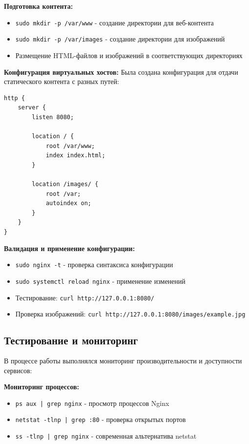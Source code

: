 \textbf{Подготовка контента:}
\begin{itemize}
    \item \texttt{sudo mkdir -p /var/www} - создание директории для веб-контента
    \item \texttt{sudo mkdir -p /var/images} - создание директории для изображений
    \item Размещение HTML-файлов и изображений в соответствующих директориях
\end{itemize}

\textbf{Конфигурация виртуальных хостов:}
Была создана конфигурация для отдачи статического контента с разных путей:

\begin{lstlisting}[caption=Конфигурация Nginx]
http {
    server {
        listen 8080;
        
        location / {
            root /var/www;
            index index.html;
        }
        
        location /images/ {
            root /var;
            autoindex on;
        }
    }
}
\end{lstlisting}

\textbf{Валидация и применение конфигурации:}
\begin{itemize}
    \item \verb|sudo nginx -t| - проверка синтаксиса конфигурации
    \item \verb|sudo systemctl reload nginx| - применение изменений
    \item Тестирование: \texttt{curl http://127.0.0.1:8080/}
    \item Проверка изображений: \texttt{curl http://127.0.0.1:8080/images/example.jpg}
\end{itemize}

\subsection{Тестирование и мониторинг}
В процессе работы выполнялся мониторинг производительности и доступности сервисов:

\textbf{Мониторинг процессов:}
\begin{itemize}
    \item \texttt{ps aux | grep nginx} - просмотр процессов Nginx
    \item \texttt{netstat -tlnp | grep :80} - проверка открытых портов
    \item \texttt{ss -tlnp | grep nginx} - современная альтернатива netstat
\end{itemize}

